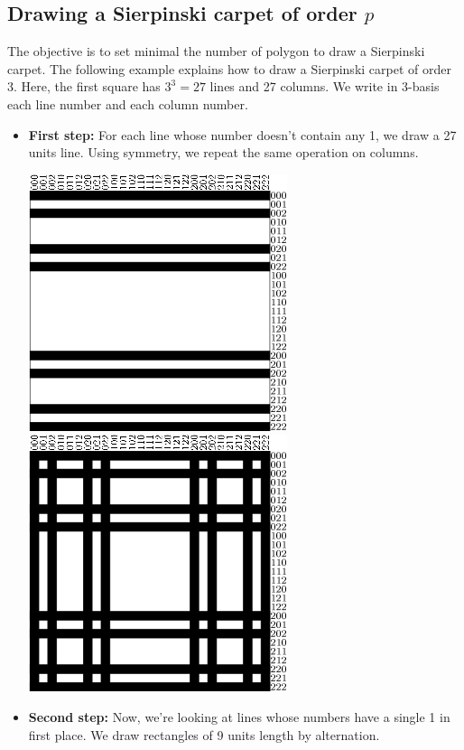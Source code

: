 \subsection{Drawing a Sierpinski carpet of order $p$}
The objective is to set minimal the number of polygon to draw a Sierpinski carpet. The following example explains how to draw a Sierpinski carpet of order 3. Here, the first square has $3^3=27$ lines and 27 columns. We write in 3-basis each line number and each column number.
\begin{itemize}
 \item [\textbullet]\textbf{First step:} For each line whose number doesn't contain any 1, we draw a 27 units line. Using symmetry, we repeat the same operation on columns.\\
\begin{center}
\includegraphics{pics/menger-schema02.png}
\includegraphics{pics/menger-schema03.png}
\end{center}
\vspace{0.2cm}
\item [\textbullet] \textbf{Second step:} Now, we're looking at lines whose numbers have a single 1 in first place. We draw rectangles of 9 units length by alternation.\\

\end{itemize}
